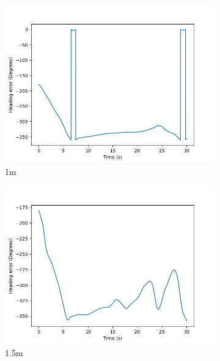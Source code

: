 \documentclass[class=article, crop=false]{standalone}
\begin{document}
\begin{figure}
\begin{subfigure}[b]{0.48\textwidth}
        \includegraphics{scenario1/rov-100m/1.0m/usv_heading_error_controlled}
        \caption{1m}
        \label{}
    \end{subfigure}
    \hfill
    \begin{subfigure}[b]{0.48\textwidth}
        \centering
        \includegraphics{scenario1/rov-100m/1.5m/usv_heading_error_controlled}
        \caption{1.5m}
        \label{}
    \end{subfigure}
    \vfill
    \begin{subfigure}[b]{0.48\textwidth}
        \centering

\end{subfigure}
\end{figure}
\end{document}
